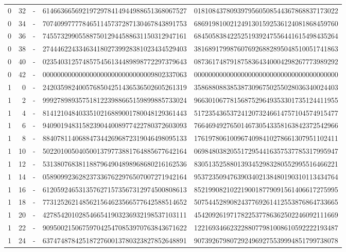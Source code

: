 \begin{longtable}{rrrll}
0 & 32 & - & 6146636656921972978414944988651368067527 & 0181084378093979560508544367868837173022 \\
0 & 34 & - & 7074099777784651145737287130467843891753 & 6869198100212491301592536124081868459760 \\
0 & 36 & - & 7455732990558875012944588631150312947161 & 6845058384225251939247556441615498435264 \\
0 & 38 & - & 2744462243346341802739928381023434529403 & 3816891799876076926882895048510051741863 \\
0 & 40 & - & 0235403125748575456134489898772297379643 & 0873617487918758364340004298267773989292 \\
0 & 42 & - & 0000000000000000000000000000009802337063 & 0000000000000000000000000000000000000000 \\
1 & 0 & - & 2420359824005768504251436536502605261319 & 3586880883853873096750255028036340024403 \\
1 & 2 & - & 9992789893575181223988665159899885733024 & 9663010677815687529649353301735124411955 \\
1 & 4 & - & 8141210484033510216889001780048129361443 & 5172354365372412073246614757104574915477 \\
1 & 6 & - & 9409019483158239044008977422780372603093 & 7664694927650146730543358163842372542966 \\
1 & 8 & - & 8840781140688473442696872319046498095133 & 1761978061009674098410278661307951102411 \\
1 & 10 & - & 5022010050405001379773881764885677642164 & 0698480382055172954416357537785317995947 \\
1 & 12 & - & 5313807683811887964904898968680216162536 & 8305135258801393452983280552995516466221 \\
1 & 14 & - & 0589099236282373367622976507007271942164 & 9537235094763903402138480190310113434764 \\
1 & 16 & - & 6120592465313576271573567312974500808613 & 8521990821022190018779091561406617275995 \\
1 & 18 & - & 7731252621485621564623566577642588514652 & 5075445289082437769261412553876864733665 \\
1 & 20 & - & 4278542010285466541903236932198537103111 & 4542092619717822537786362502246092111669 \\
1 & 22 & - & 9095002150675970425470853970763843671622 & 1221693466232288077981008610592222193487 \\
1 & 24 & - & 6374748784251872760013780323827852648891 & 9073926798072924969275539994851799738078 \\

\end{longtable}
